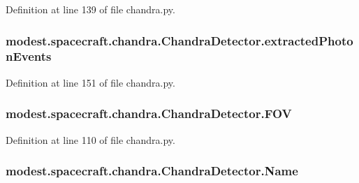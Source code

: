 Definition at line 139 of file chandra.\+py.

\subsubsection[{\texorpdfstring{extracted\+Photon\+Events}{extractedPhotonEvents}}]{\setlength{\rightskip}{0pt plus 5cm}modest.\+spacecraft.\+chandra.\+Chandra\+Detector.\+extracted\+Photon\+Events}\hypertarget{classmodest_1_1spacecraft_1_1chandra_1_1ChandraDetector_a7ea6a8de562ce6d1a24c31d87c4d70e1}{}\label{classmodest_1_1spacecraft_1_1chandra_1_1ChandraDetector_a7ea6a8de562ce6d1a24c31d87c4d70e1}


Definition at line 151 of file chandra.\+py.

\subsubsection[{\texorpdfstring{F\+OV}{FOV}}]{\setlength{\rightskip}{0pt plus 5cm}modest.\+spacecraft.\+chandra.\+Chandra\+Detector.\+F\+OV}\hypertarget{classmodest_1_1spacecraft_1_1chandra_1_1ChandraDetector_ab618f9a01fdce3840055c0dde52f1b0f}{}\label{classmodest_1_1spacecraft_1_1chandra_1_1ChandraDetector_ab618f9a01fdce3840055c0dde52f1b0f}


Definition at line 110 of file chandra.\+py.

\subsubsection[{\texorpdfstring{Name}{Name}}]{\setlength{\rightskip}{0pt plus 5cm}modest.\+spacecraft.\+chandra.\+Chandra\+Detector.\+Name}\hypertarget{classmodest_1_1spacecraft_1_1chandra_1_1ChandraDetector_aace6412cc4c3b98b8c127364f434b196}{}\label{classmodest_1_1spacecraft_1_1chandra_1_1ChandraDetector_aace6412cc4c3b98b8c127364f434b196}


